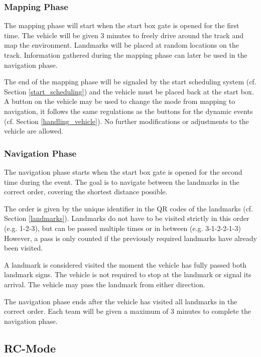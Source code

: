 \begin{highlight}[yellow]
    \subsubsection{Mapping Phase}

    The mapping phase will start when the start box gate is opened for the first
    time. The vehicle will be given 3 minutes to freely drive around the track and
    map the environment. Landmarks will be placed at random locations on the track.
    Information gathered during the mapping phase can later be used in the
    navigation phase.

    The end of the mapping phase will be signaled by the start scheduling system
    (cf. Section \ref{start_scheduling}) and the vehicle must be placed back at the
    start box. A button on the vehicle may be used to change the mode from mapping
    to navigation, it follows the same regulations as the buttons for the dynamic
    events (cf. Section \ref{handling_vehicle}). No further modifications or
    adjustments to the vehicle are allowed.

    \subsubsection{Navigation Phase}

    The navigation phase starts when the start box gate is opened for the second
    time during the event. The goal is to navigate between the landmarks in the
    correct order, covering the shortest distance possible.

    The order is given by the unique identifier in the QR codes of the landmarks
    (cf. Section \ref{landmarks}). Landmarks do not have to be visited strictly in
    this order (e.g. 1-2-3), but can be passed multiple times or in between (e.g.
    3-1-2-2-1-3) However, a pass is only counted if the previously required
    landmarks have already been visited.

    A landmark is considered visited the moment the vehicle has fully passed both
    landmark signs. The vehicle is not required to stop at the landmark or signal
    its arrival. The vehicle may pass the landmark from either direction.

    The navigation phase ends after the vehicle has visited all landmarks in the
    correct order. Each team will be given a maximum of 3 minutes to complete the
    navigation phase.

    \subsection{RC-Mode}


\end{highlight}
